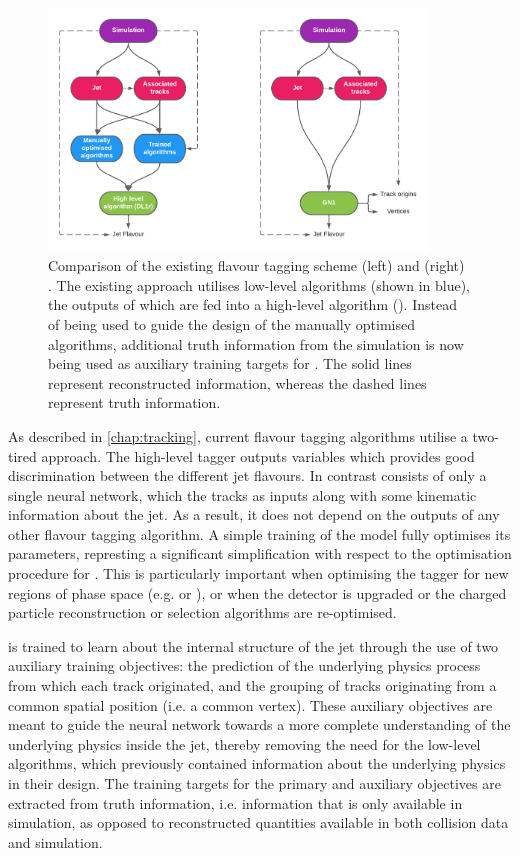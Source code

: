 \begin{figure}[!htbp]
    \centering
    \includegraphics[width=0.9\textwidth]{chapters/gnn_tagger/figs/GNN_compare_contrast.pdf}
    \caption{Comparison of the existing flavour tagging scheme (left) and \GNN (right) \cite{ATL-PHYS-PUB-2022-027}. The existing approach utilises low-level algorithms (shown in blue), the outputs of which are fed into a high-level algorithm (\DLr). Instead of being used to guide the design of the manually optimised algorithms, additional truth information from the simulation is now being used as auxiliary training targets for \GNN. The solid lines represent reconstructed information, whereas the dashed lines represent truth information.}
    \label{fig:oldvsnew}
\end{figure}

As described in \cref{chap:tracking}, current flavour tagging algorithms utilise a two-tired approach.
The high-level tagger \DLr outputs variables which provides good discrimination between the different jet flavours.
In contrast \GNN consists of only a single neural network, which the tracks as inputs along with some kinematic information about the jet.
As a result, it does not depend on the outputs of any other flavour tagging algorithm.
A simple training of the model fully optimises its parameters, represting a significant simplification with respect to the optimisation procedure for \DLr.
This is particularly important when optimising the tagger for new regions of phase space (e.g. \ctag or \highpt \btag), or when the detector is upgraded or the charged particle reconstruction or selection algorithms are re-optimised.

\GNN is trained to learn about the internal structure of the jet through the use of two auxiliary training objectives: the prediction of the underlying physics process from which each track originated, and the grouping of tracks originating from a common spatial position (i.e. a common vertex).
These auxiliary objectives are meant to guide the neural network towards a more complete understanding of the underlying physics inside the jet, thereby removing the need for the low-level algorithms, which previously contained information about the underlying physics in their design.
The training targets for the primary and auxiliary objectives are extracted from truth information, i.e. information that is only available in simulation, as opposed to reconstructed quantities available in both collision data and simulation.

